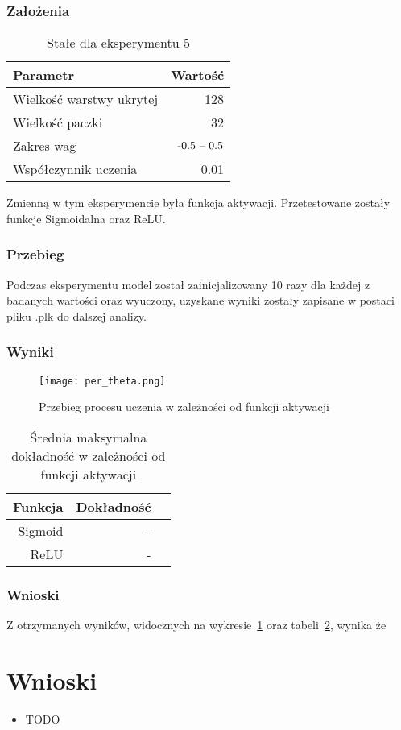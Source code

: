 \documentclass{article}
\begin{document}
\subsubsection*{Założenia}
\begin{table}[!h]
	\caption{Stałe dla eksperymentu 5}
	\label{tabela-const-5}
	\centering
	\begin{tabular}{lr}
		\toprule
		Parametr                   & Wartość         \\
		\midrule
		Wielkość warstwy ukrytej & 128               \\
		Wielkość paczki          & 32                \\
		Zakres wag                 & \($-0.5 -- 0.5$\) \\
		Współczynnik uczenia     & 0.01              \\
		\bottomrule
	\end{tabular}
\end{table}

Zmienną w tym eksperymencie była funkcja aktywacji. Przetestowane zostały funkcje Sigmoidalna oraz ReLU.
\subsubsection*{Przebieg}

Podczas eksperymentu model został zainicjalizowany 10 razy dla każdej z badanych wartości oraz wyuczony, uzyskane wyniki zostały zapisane w postaci pliku .plk do dalszej analizy.

\subsubsection*{Wyniki}
\begin{figure}[!h]
	\centering
	\caption{Przebieg procesu uczenia w zależności od funkcji aktywacji}
	\texttt{[image: per\_theta.png]}
	\label{fig:res51}
\end{figure}

\begin{table}[!h]
	\caption{Średnia maksymalna dokładność w zależności od funkcji aktywacji}
	\label{tabela-res-51}
	\centering
	\begin{tabular}{rrr}
		\toprule
		Funkcja & Dokładność \\
		\midrule
		Sigmoid & -             \\
		ReLU    & -             \\
		\bottomrule
	\end{tabular}
\end{table}

\subsubsection*{Wnioski}

Z otrzymanych wyników, widocznych na wykresie~\ref{fig:res51} oraz tabeli~\ref{tabela-res-51}, wynika że


\newpage
\section{Wnioski}

\begin{itemize}
	\item TODO
\end{itemize}
\end{document}
